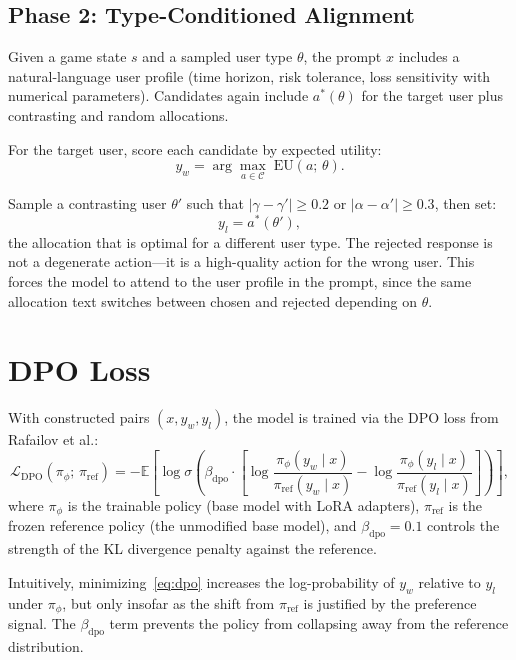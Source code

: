 \documentclass[11pt]{article}
\begin{document}
\subsection{Phase 2: Type-Conditioned Alignment}

Given a game state $s$ and a sampled user type $\theta$, the prompt $x$
includes a natural-language user profile (time horizon, risk tolerance, loss
sensitivity with numerical parameters). Candidates again include
$a^*(\theta)$ for the target user plus contrasting and random allocations.

For the target user, score each candidate by expected utility:
\begin{equation}\label{eq:p2-chosen}
  y_w = \arg\max_{a \in \mathcal{C}}\; \mathrm{EU}(a;\, \theta).
\end{equation}

Sample a contrasting user $\theta'$ such that $|\gamma - \gamma'| \ge 0.2$
or $|\alpha - \alpha'| \ge 0.3$, then set:
\begin{equation}\label{eq:p2-rejected}
  y_l = a^*(\theta'),
\end{equation}
the allocation that is optimal for a different user type. The rejected
response is not a degenerate action---it is a high-quality action for the
wrong user. This forces the model to attend to the user profile in the
prompt, since the same allocation text switches between chosen and rejected
depending on $\theta$.


\section{DPO Loss}

With constructed pairs $(x, y_w, y_l)$, the model is trained via the
DPO loss from Rafailov et al.:
\begin{equation}\label{eq:dpo}
  \mathcal{L}_{\mathrm{DPO}}(\pi_\phi;\, \pi_{\mathrm{ref}})
  = -\mathbb{E}\!\left[
    \log\sigma\!\left(
      \beta_{\mathrm{dpo}} \cdot \left[
        \log\frac{\pi_\phi(y_w \mid x)}{\pi_{\mathrm{ref}}(y_w \mid x)}
        - \log\frac{\pi_\phi(y_l \mid x)}{\pi_{\mathrm{ref}}(y_l \mid x)}
      \right]
    \right)
  \right],
\end{equation}
where $\pi_\phi$ is the trainable policy (base model with LoRA adapters),
$\pi_{\mathrm{ref}}$ is the frozen reference policy (the unmodified base
model), and $\beta_{\mathrm{dpo}} = 0.1$ controls the strength of the KL
divergence penalty against the reference.

Intuitively, minimizing~\eqref{eq:dpo} increases the log-probability of
$y_w$ relative to $y_l$ under $\pi_\phi$, but only insofar as the shift from
$\pi_{\mathrm{ref}}$ is justified by the preference signal. The
$\beta_{\mathrm{dpo}}$ term prevents the policy from collapsing away from the
reference distribution.
\end{document}
